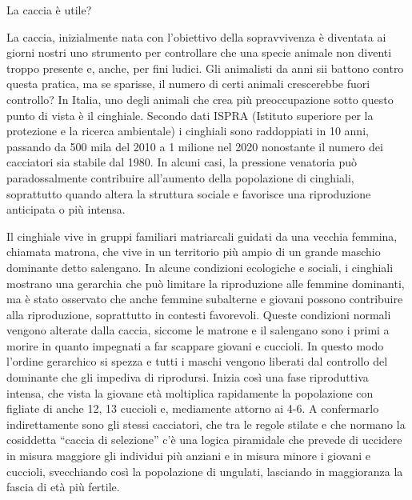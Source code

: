\documentclass[12pt]{book} %
\begin{document}
\begin{mdframed}[linewidth=1pt]
La caccia è utile?

La caccia, inizialmente nata con l'obiettivo della sopravvivenza è diventata ai giorni nostri uno
strumento per controllare che una specie animale non diventi troppo presente e, anche, per fini ludici. Gli animalisti
da anni sii battono contro questa pratica, ma se sparisse, il numero di certi animali crescerebbe fuori controllo? In
Italia, uno degli animali che crea più preoccupazione sotto questo punto di vista è il cinghiale. Secondo
dati ISPRA (Istituto superiore per la protezione e la ricerca ambientale) i cinghiali sono raddoppiati in 10 anni,
passando da 500 mila del 2010 a 1 milione nel 2020 nonostante il numero dei cacciatori sia stabile dal
1980. In alcuni casi, la pressione venatoria può paradossalmente contribuire all’aumento della popolazione di cinghiali, soprattutto quando altera la struttura sociale e favorisce una riproduzione anticipata o più intensa.

Il cinghiale vive in gruppi familiari matriarcali guidati da una vecchia femmina, chiamata matrona, che vive in un
territorio più ampio di un grande maschio dominante detto salengano. In alcune condizioni ecologiche e sociali, i cinghiali mostrano una gerarchia che può limitare la riproduzione alle femmine dominanti, ma è stato osservato che anche femmine subalterne e giovani possono contribuire alla riproduzione, soprattutto in contesti favorevoli.
Queste condizioni normali vengono alterate dalla caccia, siccome le matrone e il salengano sono i primi a morire in
quanto impegnati a far scappare giovani e cuccioli. In questo modo l'ordine gerarchico si spezza e
tutti i maschi vengono liberati dal controllo del dominante che gli impediva di riprodursi. Inizia così una fase
riproduttiva intensa, che vista la giovane età moltiplica rapidamente la popolazione con figliate di anche 12, 13
cuccioli e, mediamente attorno ai 4-6. A confermarlo indirettamente sono gli stessi cacciatori, che tra le regole stilate e che normano la
cosiddetta “caccia di selezione” c'è una logica piramidale che prevede di uccidere in misura maggiore gli individui più
anziani e in misura minore i giovani e cuccioli, svecchiando così la popolazione di ungulati, lasciando in maggioranza
la fascia di età più fertile.


\end{mdframed}
\end{document}

